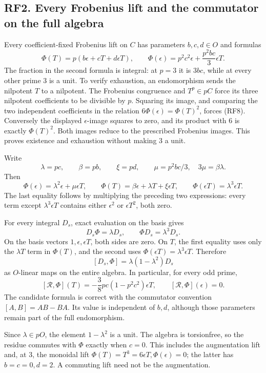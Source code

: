 \documentclass[
  10pt,
]{article}
\begin{document}
\subsection{RF2. Every Frobenius lift and the commutator on the full
algebra}\label{rf2.-every-frobenius-lift-and-the-commutator-on-the-full-algebra}

Every coefficient-fixed Frobenius lift on \(C\) has parameters
\(b,c,d\in O\) and formulas \[
\Phi(T)=p(b\epsilon+cT+d\epsilon T),\qquad
\Phi(\epsilon)=p^2c^2\epsilon+\frac{p^2bc}{3}\epsilon T.
\tag{RF8}
\] The fraction in the second formula is integral: at \(p=3\) it is
\(3bc\), while at every other prime 3 is a unit. To verify exhaustion,
an endomorphism sends the nilpotent \(T\) to a nilpotent. The Frobenius
congruence and \(T^p\in pC\) force its three nilpotent coefficients to
be divisible by \(p\). Squaring its image, and comparing the two
independent coefficients in the relation \(6\Phi(\epsilon)=\Phi(T)^2\),
forces (RF8). Conversely the displayed \(\epsilon\)-image squares to
zero, and its product with 6 is exactly \(\Phi(T)^2\). Both images
reduce to the prescribed Frobenius images. This proves existence and
exhaustion without making 3 a unit.

Write \[
\lambda=pc,\qquad \beta=pb,\qquad \xi=pd,\qquad
\mu=p^2bc/3,
\quad 3\mu=\beta\lambda.
\] Then \[
\Phi(\epsilon)=\lambda^2\epsilon+\mu\epsilon T,\qquad
\Phi(T)=\beta\epsilon+\lambda T+\xi\epsilon T,\qquad
\Phi(\epsilon T)=\lambda^3\epsilon T.
\tag{RF9}
\] The last equality follows by multiplying the preceding two
expressions: every term except \(\lambda^3\epsilon T\) contains either
\(\epsilon^2\) or \(\epsilon T^2\), both zero.

For every integral \(D_s\), exact evaluation on the basis gives \[
D_s\Phi=\lambda D_s,\qquad
\Phi D_s=\lambda^3D_s.
\tag{RF10}
\] On the basis vectors \(1,\epsilon,\epsilon T\), both sides are zero.
On \(T\), the first equality uses only the \(\lambda T\) term in
\(\Phi(T)\), and the second uses
\(\Phi(\epsilon T)=\lambda^3\epsilon T\). Therefore \[
[D_s,\Phi]=\lambda(1-\lambda^2)D_s
\tag{RF11}
\] as \(O\)-linear maps on the entire algebra. In particular, for every
odd prime, \[
[\mathcal R,\Phi](T)
=-\frac38pc(1-p^2c^2)\epsilon T,\qquad
[\mathcal R,\Phi](\epsilon)=0.
\tag{RF12}
\] The candidate formula is correct with the commutator convention
\([A,B]=AB-BA\). Its value is independent of \(b,d\), although those
parameters remain part of the full endomorphism.

Since \(\lambda\in pO\), the element \(1-\lambda^2\) is a unit. The
algebra is torsionfree, so the residue commutes with \(\Phi\) exactly
when \(c=0\). This includes the augmentation lift and, at 3, the
monoidal lift \(\Phi(T)=T^3=6\epsilon T,\Phi(\epsilon)=0\); the latter
has \(b=c=0,d=2\). A commuting lift need not be the augmentation.
\end{document}
